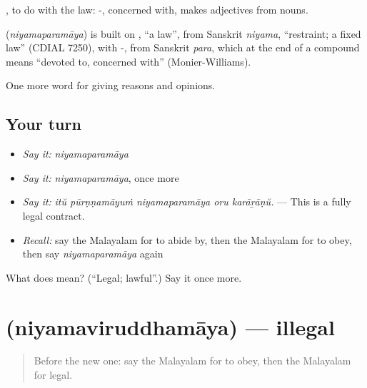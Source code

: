 , to do with the law: -, concerned with, makes adjectives from nouns.

\begin{cousinweb}
\textbf{} (\emph{niyamaparamāya}) is built on , \textquotedblleft{}a law\textquotedblright{}, from Sanskrit \emph{niyama}, \textquotedblleft{}restraint; a fixed law\textquotedblright{} (CDIAL 7250), with -, from Sanskrit \emph{para}, which at the end of a compound means \textquotedblleft{}devoted to, concerned with\textquotedblright{} (Monier-Williams).
\end{cousinweb}

\begin{grammarlens}[title={What you've built}]
One more word for giving reasons and opinions.
\end{grammarlens}

\subsection*{Your turn}
\begin{itemize}
\raggedright
  \item \emph{Say it:} \emph{niyamaparamāya}
  \item \emph{Say it:} \emph{niyamaparamāya}, once more
  \item \emph{Say it:} \emph{itŭ pūrṇṇamāyuṁ niyamaparamāya oru karāṟāṇŭ.} — This is a fully legal contract.
  \item \emph{Recall:} say the Malayalam for to abide by, then the Malayalam for to obey, then say \emph{niyamaparamāya} again
\end{itemize}

\begin{tcolorbox}[breakable,colback=teal!4,colframe=teal!35!black,title={Before you move on}]
What does  mean? (\textquotedblleft{}Legal; lawful\textquotedblright{}.) Say it once more.
\end{tcolorbox}
\section[\texorpdfstring{\ml{നിയമവിരുദ്ധമായ} (niyamaviruddhamāya)}{നിയമവിരുദ്ധമായ (niyamaviruddhamāya)}]{ (niyamaviruddhamāya) — illegal}

\label{lesson:ML-C417-niyamaviruddhamaya}



\begin{quote}
Before the new one: say the Malayalam for to obey, then the Malayalam for legal.
\end{quote}

